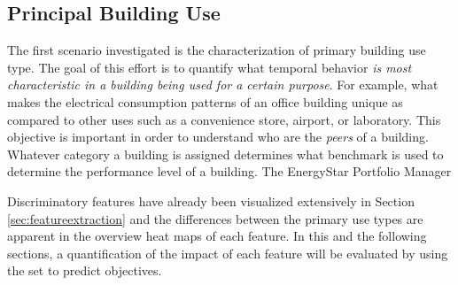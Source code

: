 \subsection{Principal Building Use}
\label{sec:buildinguse}

The first scenario investigated is the characterization of primary building use type. The goal of this effort is to quantify what temporal behavior \emph{is most characteristic in a building being used for a certain purpose}. For example, what makes the electrical consumption patterns of an office building unique as compared to other uses such as a convenience store, airport, or laboratory. This objective is important in order to understand who are the \emph{peers} of a building. Whatever category a building is assigned determines what benchmark is used to determine the performance level of a building. The EnergyStar Portfolio Manager 

Discriminatory features have already been visualized extensively in Section \ref{sec:featureextraction} and the differences between the primary use types are apparent in the overview heat maps of each feature. In this and the following sections, a quantification of the impact of each feature will be evaluated by using the set to predict objectives.